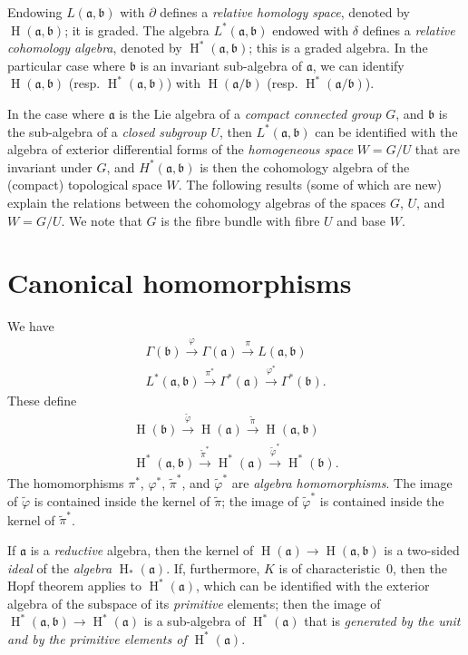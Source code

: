 \documentclass{article}
\newcommand{\fk}{\mathfrak}
\DeclareMathOperator{\HH}{H}
\newcommand{\oldpage}[1]{\marginpar{\footnotesize$\Big\vert$ \textit{p.~#1}}}
\begin{document}
Endowing $L(\fk{a},\fk{b})$ with $\partial$ defines a \emph{relative homology space}, denoted by $\HH(\fk{a},\fk{b})$;
it is graded.
The algebra $L^*(\fk{a},\fk{b})$ endowed with $\delta$ defines a \emph{relative cohomology algebra}, denoted by $\HH^*(\fk{a},\fk{b})$;
this is a graded algebra.
In the particular case where $\fk{b}$ is an invariant sub-algebra of $\fk{a}$, we can identify $\HH(\fk{a},\fk{b})$ (resp. $\HH^*(\fk{a},\fk{b})$) with $\HH(\fk{a}/\fk{b})$ (resp. $\HH^*(\fk{a}/\fk{b})$).

In the case where $\fk{a}$ is the Lie algebra of a \emph{compact connected group} $G$, and $\fk{b}$ is the sub-algebra of a \emph{closed subgroup} $U$, then $L^*(\fk{a},\fk{b})$ can be identified with the algebra of exterior differential forms of the \emph{homogeneous space} $W=G/U$ that are invariant under $G$, and $H^*(\fk{a},\fk{b})$ is then the cohomology algebra of the (compact) topological space $W$.
The following results (some of which are new) explain the relations between the cohomology algebras of the spaces $G$, $U$, and $W=G/U$.
We note that $G$ is the fibre bundle with fibre $U$ and base $W$.


\section{Canonical homomorphisms}
\label{III.2}

We have
\[
  \begin{gathered}
    \Gamma(\fk{b}) \xrightarrow{\varphi} \Gamma(\fk{a}) \xrightarrow{\pi} L(\fk{a},\fk{b})
  \\L^*(\fk{a},\fk{b}) \xrightarrow{\pi^*} \Gamma^*(\fk{a}) \xrightarrow{\varphi^*} \Gamma^*(\fk{b}).
  \end{gathered}
\]
These define
\oldpage{73}
\[
  \begin{gathered}
    \HH(\fk{b}) \xrightarrow{\widetilde{\varphi}} \HH(\fk{a}) \xrightarrow{\widetilde{\pi}} \HH(\fk{a},\fk{b})
  \\\HH^*(\fk{a},\fk{b}) \xrightarrow{\widetilde{\pi}^*} \HH^*(\fk{a}) \xrightarrow{\widetilde{\varphi}^*} \HH^*(\fk{b}).
  \end{gathered}
\]
The homomorphisms $\pi^*$, $\varphi^*$, $\widetilde{\pi}^*$, and $\widetilde{\varphi}^*$ are \emph{algebra homomorphisms}.
The image of $\widetilde{\varphi}$ is contained inside the kernel of $\widetilde{\pi}$;
the image of $\widetilde{\varphi}^*$ is contained inside the kernel of $\widetilde{\pi}^*$.

If $\fk{a}$ is a \emph{reductive} algebra, then the kernel of $\HH(\fk{a})\to\HH(\fk{a},\fk{b})$ is a two-sided \emph{ideal} of the \emph{algebra} $\HH_*(\fk{a})$.
If, furthermore, $K$ is of characteristic~$0$, then the Hopf theorem applies to $\HH^*(\fk{a})$, which can be identified with the exterior algebra of the subspace of its \emph{primitive} elements;
then the image of $\HH^*(\fk{a},\fk{b})\to\HH^*(\fk{a})$ is a sub-algebra of $\HH^*(\fk{a})$ that is \emph{generated by the unit and by the primitive elements of $\HH^*(\fk{a})$}.
\end{document}
